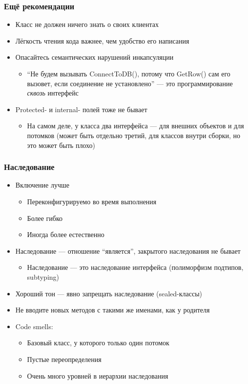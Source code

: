 \documentclass[xetex,mathserif,serif]{beamer}
\begin{document}
	\begin{frame}
		\frametitle{Ещё рекомендации}
		\begin{itemize}
			\item Класс не должен ничего знать о своих клиентах
			\item Лёгкость чтения кода важнее, чем удобство его написания
			\item Опасайтесь семантических нарушений инкапсуляции
			\begin{itemize}
				\item ``Не будем вызывать ConnectToDB(), потому что GetRow() сам его вызовет, если соединение не установлено'' --- это программирование \textit{сквозь} интерфейс
			\end{itemize}
			\item Protected- и internal- полей тоже не бывает
			\begin{itemize}
				\item На самом деле, у класса два интерфейса --- для внешних объектов и для потомков (может быть отдельно третий, для классов внутри сборки, но это может быть плохо)
			\end{itemize}
		\end{itemize}
	\end{frame}

	\begin{frame}
		\frametitle{Наследование}
		\begin{itemize}
			\item Включение лучше
			\begin{itemize}
				\item Переконфигурируемо во время выполнения
				\item Более гибко
				\item Иногда более естественно
			\end{itemize}
			\item Наследование --- отношение ``является'', закрытого наследования не бывает
			\begin{itemize}
				\item Наследование --- это наследование интерфейса (полиморфизм подтипов, subtyping)
			\end{itemize}
			\item Хороший тон --- явно запрещать наследование (sealed-классы)
			\item Не вводите новых методов с такими же именами, как у родителя
			\item Code smells:
			\begin{itemize}
				\item Базовый класс, у которого только один потомок
				\item Пустые переопределения
				\item Очень много уровней в иерархии наследования
			\end{itemize}
		\end{itemize}
	\end{frame}
\end{document}

